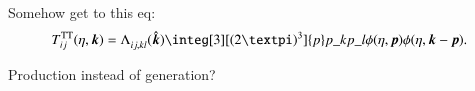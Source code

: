 





\begin{bullets}
    \item Somehow get to this eq: 
    \begin{equation}
        \tensor*{T}{^{\mathrm{TT}}_{ij}}(\eta, \vec{k}) = \tensor{\Lambda}{_{ij,kl}}(\hat{\vec{k}})  \integ[3][(2\ppi)^3]{p}  p\_{k} p\_{l} \phi(\eta, \vec{p}) \phi(\eta, \vec{k}-\vec{p}).
    \end{equation}
    \item Production instead of generation?
\end{bullets}




% 
